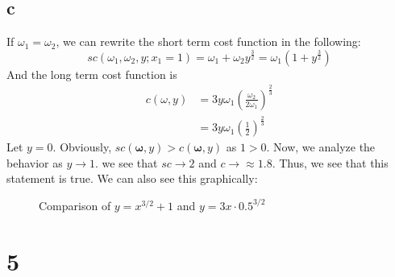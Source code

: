 \documentclass[11pt]{article}
\begin{document}
\subsection*{c}
If $\omega_1 = \omega_2$, we can rewrite the short term cost function in the following:
\[
    sc(\omega_1, \omega_2, y; x_1 = 1) = \omega_1 + \omega_2 y^\frac{3}{2} = \omega_1(1 + y^\frac{3}{2})
\]
And the long term cost function is
\begin{align*}
    c(\omega, y) &= 3y \omega_1 \left( \frac{\omega_2}{2\omega_1} \right)^\frac{2}{3}\\
    &= 3y \omega_1 \left( \frac{1}{2} \right)^\frac{2}{3}
\end{align*}
Let $y = 0$. Obviously, $sc(\mathbf{\omega}, y) > c(\mathbf{\omega}, y)$ as $1 > 0$. Now, we analyze the behavior as $y \to 1$. we see that $sc \to 2$ and $c \to \approx 1.8$. Thus, we see that this statement is true. We can also see this graphically:
\begin{figure}[H]
    \centering
    \caption{Comparison of $y = x^{3/2} + 1$ and $y = 3x \cdot 0.5^{3/2}$}
    \label{fig:comparison}
\end{figure}
\section*{5}
\end{document}
